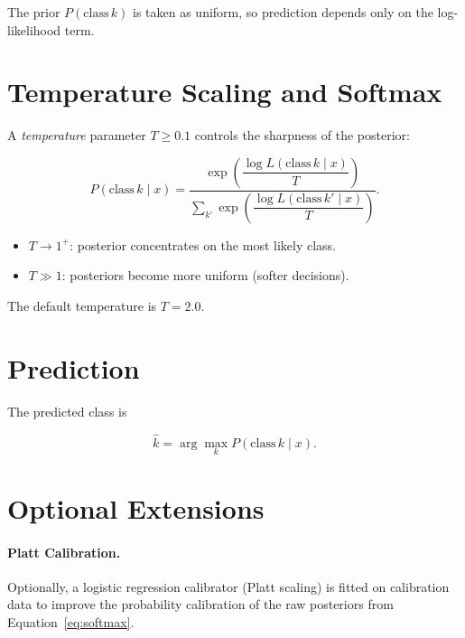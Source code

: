 \documentclass[11pt]{article}
\begin{document}
The prior \(P(\text{class}\,k)\) is taken as uniform, so prediction depends
only on the log-likelihood term.

\section{Temperature Scaling and Softmax}

A \emph{temperature} parameter \(T \geq 0.1\) controls the sharpness of the
posterior:

\begin{equation}
  P(\text{class}\,k \mid x)
  = \frac{\exp\!\left(\dfrac{\log L(\text{class}\,k \mid x)}{T}\right)}
         {\displaystyle\sum_{k'} \exp\!\left(\dfrac{\log L(\text{class}\,k' \mid x)}{T}\right)}.
  \label{eq:softmax}
\end{equation}

\begin{itemize}
  \item \(T \to 1^+\): posterior concentrates on the most likely class.
  \item \(T \gg 1\): posteriors become more uniform (softer decisions).
\end{itemize}

The default temperature is \(T = 2.0\).

\section{Prediction}

The predicted class is

\begin{equation}
  \hat{k} = \arg\max_k P(\text{class}\,k \mid x).
\end{equation}

\section{Optional Extensions}

\paragraph{Platt Calibration.}

Optionally, a logistic regression calibrator (Platt scaling) is fitted on
calibration data to improve the probability calibration of the raw posteriors
from Equation~\eqref{eq:softmax}.
\end{document}

